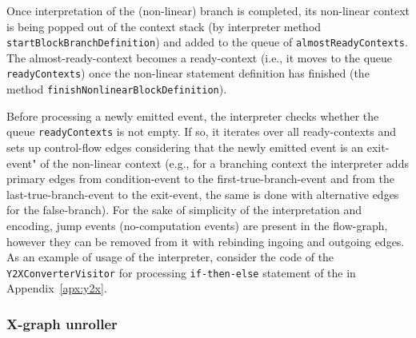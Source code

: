 Once interpretation of the (non-linear) branch is completed, its non-linear context is being popped out of the context stack (by interpreter method \texttt{startBlockBranchDefinition}) and added to the queue of \texttt{almostReadyContexts}.
The almost-ready-context becomes a ready-context (i.e., it moves to the queue \texttt{readyContexts}) once the non-linear statement definition has finished (the method \texttt{finishNonlinearBlockDefinition}).

Before processing a newly emitted event, the interpreter checks whether the queue \texttt{readyContexts} is not empty.
If so, it iterates over all ready-contexts and sets up control-flow edges considering that the newly emitted event is an exit-event" of the non-linear context (e.g., for a branching context the interpreter adds primary edges from condition-event to the first-true-branch-event and from the last-true-branch-event to the exit-event, the same is done with alternative edges for the false-branch).
For the sake of simplicity of the interpretation and encoding, jump events (no-computation events) are present in the flow-graph, however they can be removed from it with rebinding ingoing and outgoing edges.
As an example of usage of the interpreter, consider the code of the \texttt{Y2XConverterVisitor} for processing \texttt{if-then-else} statement of the \ytree{} in Appendix~\ref{apx:y2x}.


\subsubsection{X-graph unroller}
\label{ch:impl:proc:x-unroll}

